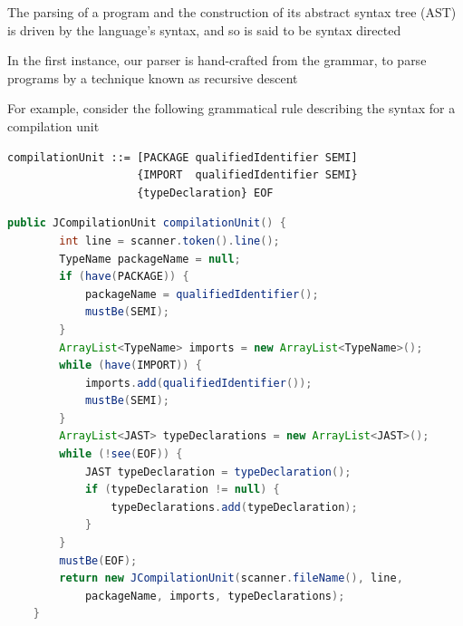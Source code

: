 \documentclass[8pt,a4paper,compress]{beamer}
\begin{document}
\begin{frame}[fragile]
\pause

The parsing of a \jmm program and the construction of its abstract syntax tree (AST) is driven by the language's syntax, and so is said to be syntax directed

\pause
\bigskip

In the first instance, our parser is hand-crafted from the \jmm grammar, to parse \jmm programs by a technique known as recursive descent

\pause
\bigskip

For example, consider the following grammatical rule describing the syntax for a compilation unit

\begin{lstlisting}[language={}]
compilationUnit ::= [PACKAGE qualifiedIdentifier SEMI]
                    {IMPORT  qualifiedIdentifier SEMI}
                    {typeDeclaration} EOF 
\end{lstlisting}
\end{frame}

\begin{frame}[fragile]
\pause\transdissolve

\begin{tcolorbox}[enhanced,drop shadow southwest,sharp corners,size=fbox,colback=white,fontlower=\small\ttfamily,collower=silver100]

\begin{lstlisting}[language=Java,style=focusin]
    public JCompilationUnit compilationUnit() {
        int line = scanner.token().line();
        TypeName packageName = null;
        if (have(PACKAGE)) {
            packageName = qualifiedIdentifier();
            mustBe(SEMI);
        }
        ArrayList<TypeName> imports = new ArrayList<TypeName>();
        while (have(IMPORT)) {
            imports.add(qualifiedIdentifier());
            mustBe(SEMI);
        }
        ArrayList<JAST> typeDeclarations = new ArrayList<JAST>();
        while (!see(EOF)) {
            JAST typeDeclaration = typeDeclaration();
            if (typeDeclaration != null) {
                typeDeclarations.add(typeDeclaration);
            }
        }
        mustBe(EOF);
        return new JCompilationUnit(scanner.fileName(), line, 
            packageName, imports, typeDeclarations);
    }

\end{lstlisting}

\tcblower

\text{\\}

\end{tcolorbox}
\end{frame}
\end{document}

